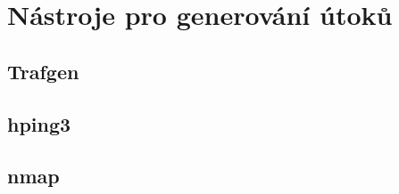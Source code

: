 \chapter{Nástroje pro generování útoků}
\label{chap:nastroje_pro_dos}
\section{Trafgen}

\section{hping3}

\section{nmap}